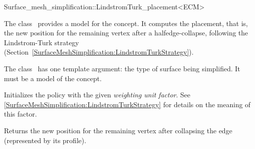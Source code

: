 

\begin{ccRefFunctionObjectClass}{Surface_mesh_simplification::LindstromTurk_placement<ECM>}


\ccDefinition

The class \ccRefName\ provides a model for the  concept. 
It computes the placement, that is, the new position for the remaining vertex after
a halfedge-collapse, following the Lindstrom-Turk strategy
(Section~\ref{SurfaceMeshSimplification:LindstromTurkStrategy}).

The class \ccRefName\ has one template argument: the type of surface being simplified. 
It must be a model of the  concept.


\ccIsModel
{}

\ccCreation
{} 
{Initializes the policy with the given {\em weighting unit factor}.
See \ref{SurfaceMeshSimplification:LindstromTurkStrategy} for details on the meaning of this factor.} 

\ccOperations
{} 
  \ccTagFullDeclarations
  {Returns the new position for the remaining vertex after collapsing the edge
  (represented by its profile).}

\ccSeeAlso
{}
\end{ccRefFunctionObjectClass}


